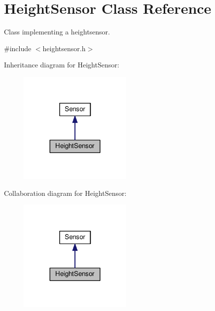 \hypertarget{classHeightSensor}{}\section{Height\+Sensor Class Reference}
\label{classHeightSensor}


Class implementing a heightsensor.  




{\ttfamily \#include $<$heightsensor.\+h$>$}



Inheritance diagram for Height\+Sensor\+:\nopagebreak
\begin{figure}[H]
\begin{center}
\leavevmode
\includegraphics[width=156pt]{classHeightSensor__inherit__graph}
\end{center}
\end{figure}


Collaboration diagram for Height\+Sensor\+:\nopagebreak
\begin{figure}[H]
\begin{center}
\leavevmode
\includegraphics[width=156pt]{classHeightSensor__coll__graph}
\end{center}
\end{figure}
